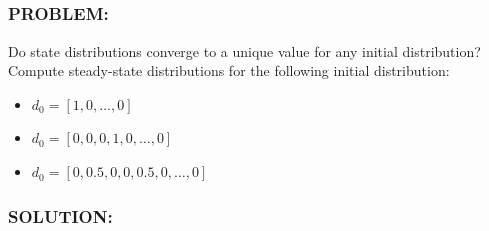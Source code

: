 \documentclass[]{article}
\newcommand{\Problem}{\subsubsection*{\textbf{PROBLEM:}}}
\newcommand{\Solution}{\subsubsection*{\textbf{SOLUTION:}}}
\begin{document}
\subsection{}
\Problem
Do state distributions converge to a unique value for any initial distribution? Compute steady-state distributions for the following initial distribution:
\begin{itemize}
    \item $d_0 = [1,0,\dots,0]$
    \item $d_0 = [0,0,0,1,0,\dots,0]$
    \item $d_0 = [0, 0.5, 0, 0, 0.5, 0, \dots,0]$
\end{itemize}

\Solution
\begin{itemize}
    \item $(d_0^T L)^T = \mqty[.2 \\
    0.3 \\
    0   \\
    0   \\
    0   \\
    0   \\
    0   \\
    0   \\
    0   \\
    0   \\
    0   \\
    0   \\
    0   \\
    0.5 \\
    0   \\
    0  ]$
    \item $(d_0^T L)^T = \mqty[
    0   \\
    0   \\
    0   \\
    0   \\
    0.5 \\
    0   \\
    0   \\
    0   \\
    0   \\
    0   \\
    0   \\
    0   \\
    0   \\
    0   \\
    0   \\
    0.5 ]$
    \item $(d_0^T L)^T = \mqty[
    .05 \\

\end{itemize}
\end{document}
